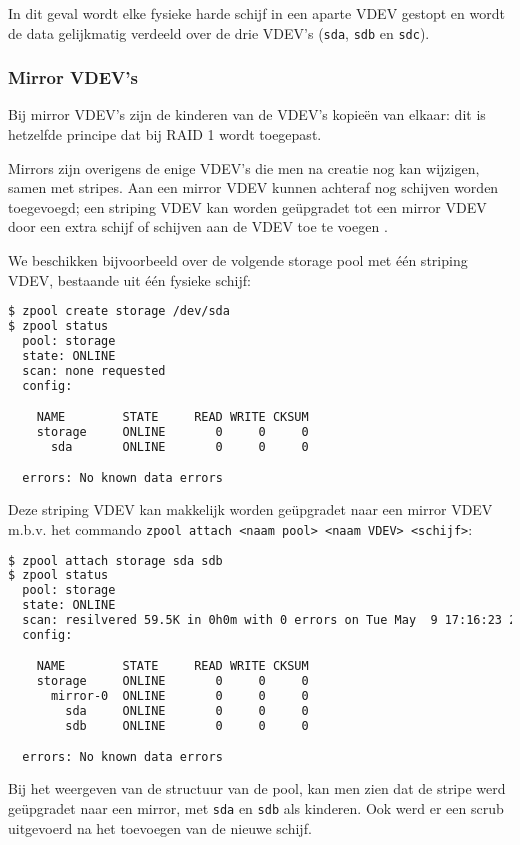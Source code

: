 In dit geval wordt elke fysieke harde schijf in een aparte VDEV gestopt en wordt de data gelijkmatig verdeeld over de drie VDEV's (\texttt{sda}, \texttt{sdb} en \texttt{sdc}).

\subsubsection{Mirror VDEV's}

Bij mirror VDEV's zijn de kinderen van de VDEV's kopieën van elkaar: dit is hetzelfde principe dat bij RAID 1 wordt toegepast. 

Mirrors zijn overigens de enige VDEV's die men na creatie nog kan wijzigen, samen met stripes. Aan een mirror VDEV kunnen achteraf nog schijven worden toegevoegd; een \gls{striping} VDEV kan worden geüpgradet tot een mirror VDEV door een extra schijf of schijven aan de VDEV toe te voegen \autocite{FBSDDP2017}.

We beschikken bijvoorbeeld over de volgende storage pool met één \gls{striping} VDEV, bestaande uit één fysieke schijf:

\begin{lstlisting}[language=bash,style=command_style]
$ zpool create storage /dev/sda
$ zpool status
  pool: storage
  state: ONLINE
  scan: none requested
  config:

	NAME        STATE     READ WRITE CKSUM
	storage     ONLINE       0     0     0
	  sda       ONLINE       0     0     0

  errors: No known data errors
\end{lstlisting}

Deze \gls{striping} VDEV kan makkelijk worden geüpgradet naar een mirror VDEV m.b.v. het commando \texttt{zpool attach <naam pool> <naam VDEV> <schijf>}:

\begin{lstlisting}[language=bash,style=command_style]
$ zpool attach storage sda sdb
$ zpool status
  pool: storage
  state: ONLINE
  scan: resilvered 59.5K in 0h0m with 0 errors on Tue May  9 17:16:23 2017
  config:

	NAME        STATE     READ WRITE CKSUM
	storage     ONLINE       0     0     0
	  mirror-0  ONLINE       0     0     0
	    sda     ONLINE       0     0     0
	    sdb     ONLINE       0     0     0

  errors: No known data errors
\end{lstlisting}

Bij het weergeven van de structuur van de pool, kan men zien dat de stripe werd geüpgradet naar een mirror, met \texttt{sda} en \texttt{sdb} als kinderen. Ook werd er een scrub uitgevoerd na het toevoegen van de nieuwe schijf.

